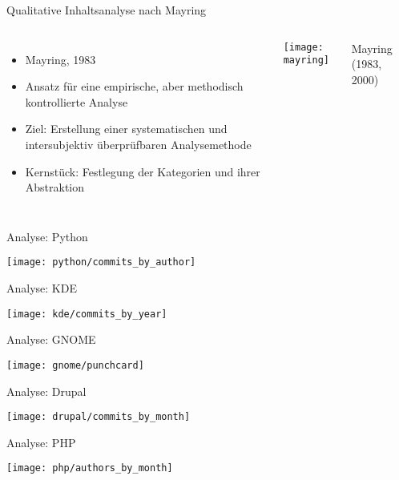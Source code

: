 \documentclass[11pt]{beamer}
\newlength{\colwidth}
\begin{document}
\begin{frame}[t]{Qualitative Inhaltsanalyse nach Mayring}
  \begin{columns}[T]
  \column{\colwidth}
    \begin{itemize}
      \item Mayring, 1983
      \item Ansatz für eine empirische, aber methodisch kontrollierte Analyse
      \item Ziel: Erstellung einer systematischen und intersubjektiv überprüfbaren Analysemethode
      \item Kernstück: Festlegung der Kategorien und ihrer Abstraktion
    \end{itemize}
  \column{\colwidth}
    \texttt{[image: mayring]}

    {\tiny\hfill
    Mayring (1983, 2000)
    }
  \end{columns}
\end{frame}

\begin{frame}{Analyse: Python}
  \begin{center}
    \texttt{[image: python/commits\_by\_author]}
  \end{center}
\end{frame}

\begin{frame}{Analyse: KDE}
  \begin{center}
    \texttt{[image: kde/commits\_by\_year]}
  \end{center}
\end{frame}

\begin{frame}{Analyse: GNOME}
  \begin{center}
    \texttt{[image: gnome/punchcard]}
  \end{center}
\end{frame}

\begin{frame}{Analyse: Drupal}
  \begin{center}
    \texttt{[image: drupal/commits\_by\_month]}
  \end{center}
\end{frame}

\begin{frame}{Analyse: PHP}
  \begin{center}
    \texttt{[image: php/authors\_by\_month]}
  \end{center}
\end{frame}
\end{document}
